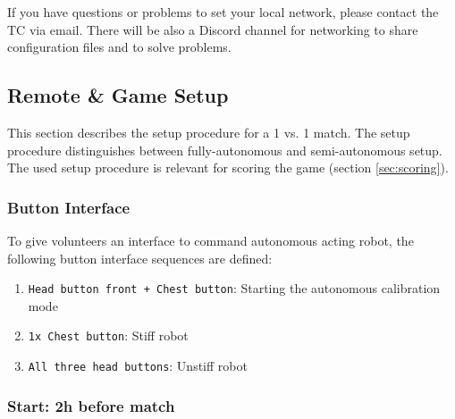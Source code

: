 If you have questions or problems to set your local network, please contact the TC via email. There will be also a Discord channel for networking to share configuration files and to solve problems.

\subsection{Remote \& Game Setup}
\label{sec:remote_game_setup}
This section describes the setup procedure for a 1 vs. 1 match. The setup procedure distinguishes between fully-autonomous and semi-autonomous setup. The used setup procedure is relevant for scoring the game (\cf section \ref{sec:scoring}).

\subsubsection{Button Interface}
To give volunteers an interface to command autonomous acting robot, the following button interface sequences are defined:
\begin{enumerate}
	\item \texttt{Head button front + Chest button}: Starting the autonomous calibration mode
	\item \texttt{1x Chest button}: Stiff robot
	\item \texttt{All three head buttons}: Unstiff robot
\end{enumerate} 

\subsubsection{Start: 2h before match}

